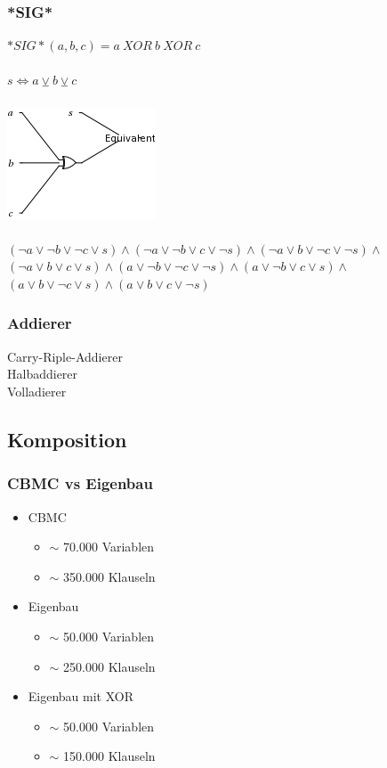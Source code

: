\documentclass{beamer}
\begin{document}
    \begin{frame}
      \frametitle{*SIG*}
      $ *SIG*(a, b, c) = a~XOR~b~XOR~c $\\
      ~\\
      $ s \Leftrightarrow a \veebar b \veebar c $\\
      ~\\
      \includegraphics[scale=0.5]{sig.png}\\
      ~\\
      $ (\neg a \vee \neg b \vee \neg c \vee s) \wedge (\neg a \vee \neg b \vee c \vee \neg s) \wedge (\neg a \vee b \vee \neg c \vee \neg s) \wedge$\\
      $ (\neg a \vee b \vee c \vee s) \wedge (a \vee \neg b \vee \neg c \vee \neg s) \wedge (a \vee \neg b \vee c \vee s) \wedge $\\
      $ (a \vee b \vee \neg c \vee s) \wedge (a \vee b \vee c \vee \neg s) $
    \end{frame}
    \begin{frame}
      \frametitle{Addierer}
      Carry-Riple-Addierer\\
      Halbaddierer\\
      Volladierer
    \end{frame}
  \subsection{Komposition}
  \begin{frame}
    \frametitle{CBMC vs Eigenbau}
    \begin{itemize}
      \item CBMC
      \begin{itemize}
        \item $ \sim $ 70.000 Variablen
        \item $ \sim $ 350.000 Klauseln
      \end{itemize}
      \item Eigenbau
      \begin{itemize}
        \item $ \sim $ 50.000 Variablen
        \item $ \sim $ 250.000 Klauseln
      \end{itemize}
      \item Eigenbau mit XOR
      \begin{itemize}
        \item $ \sim $ 50.000 Variablen
        \item $ \sim $ 150.000 Klauseln
      \end{itemize}
    \end{itemize}
  \end{frame}
\end{document}
